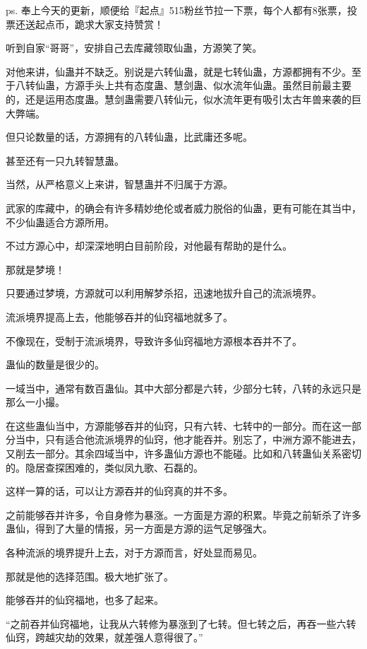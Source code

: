 
\begin{this_body}

ps. 奉上今天的更新，顺便给『起点』515粉丝节拉一下票，每个人都有8张票，投票还送起点币，跪求大家支持赞赏！

听到自家“哥哥”，安排自己去库藏领取仙蛊，方源笑了笑。

对他来讲，仙蛊并不缺乏。别说是六转仙蛊，就是七转仙蛊，方源都拥有不少。至于八转仙蛊，方源手头上共有态度蛊、慧剑蛊、似水流年仙蛊。虽然目前最主要的，还是运用态度蛊。慧剑蛊需要八转仙元，似水流年更有吸引太古年兽来袭的巨大弊端。

但只论数量的话，方源拥有的八转仙蛊，比武庸还多呢。

甚至还有一只九转智慧蛊。

当然，从严格意义上来讲，智慧蛊并不归属于方源。

武家的库藏中，的确会有许多精妙绝伦或者威力脱俗的仙蛊，更有可能在其当中，不少仙蛊适合方源所用。

不过方源心中，却深深地明白目前阶段，对他最有帮助的是什么。

那就是梦境！

只要通过梦境，方源就可以利用解梦杀招，迅速地拔升自己的流派境界。

流派境界提高上去，他能够吞并的仙窍福地就多了。

不像现在，受制于流派境界，导致许多仙窍福地方源根本吞并不了。

蛊仙的数量是很少的。

一域当中，通常有数百蛊仙。其中大部分都是六转，少部分七转，八转的永远只是那么一小撮。

在这些蛊仙当中，方源能够吞并的仙窍，只有六转、七转中的一部分。而在这一部分当中，只有适合他流派境界的仙窍，他才能吞并。别忘了，中洲方源不能进去，又削去一部分。其余四域当中，许多蛊仙方源也不能碰。比如和八转蛊仙关系密切的。隐居查探困难的，类似凤九歌、石磊的。

这样一算的话，可以让方源吞并的仙窍真的并不多。

之前能够吞并许多，令自身修为暴涨。一方面是方源的积累。毕竟之前斩杀了许多蛊仙，得到了大量的情报，另一方面是方源的运气足够强大。

各种流派的境界提升上去，对于方源而言，好处显而易见。

那就是他的选择范围。极大地扩张了。

能够吞并的仙窍福地，也多了起来。

“之前吞并仙窍福地，让我从六转修为暴涨到了七转。但七转之后，再吞一些六转仙窍，跨越灾劫的效果，就差强人意得很了。”


\end{this_body}
